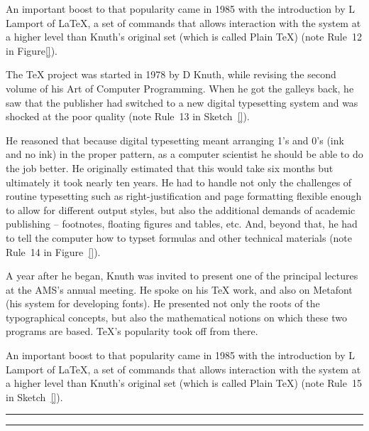 \documentclass[12pt]{book}
\newcommand{\blueB}[2][\linewidth]{%
{\color{blue}\rule{#1}{#2}}}
\newcommand{\greenB}[2][\linewidth]{%
{\color{green}\rule{#1}{#2}}}
\begin{document}
An important boost to that popularity came in 1985 with the introduction by L Lamport of LaTeX, a set of commands that allows interaction
with the system at a higher level than Knuth's original set (which is called Plain TeX) (note Rule~12 in Figure\ref{}).


The TeX project was started in 1978 by D Knuth, while revising the second volume of his Art of Computer Programming. When he got the
galleys back, he saw that the publisher had switched to a new digital typesetting system and was shocked at the poor quality (note Rule~13 in Sketch~\ref{}).


He reasoned that because digital typesetting meant arranging 1's and 0's (ink and no ink) in the proper pattern, as a computer scientist
he should be able to do the job better. He originally estimated that this would take six months but ultimately it took nearly ten years.
He had to handle not only the challenges of routine typesetting such as right-justification and page formatting flexible enough to allow
for different output styles, but also the additional demands of academic publishing -- footnotes, floating figures and tables, etc. And,
beyond that, he had to tell the computer how to typset formulas and other technical materials (note Rule~14 in Figure~\ref{}).


A year after he began, Knuth was invited to present one of the principal lectures at the AMS's annual meeting. He spoke on his TeX work,
and also on Metafont (his system for developing fonts). He presented not only the roots of the typographical concepts, but also the
mathematical notions on which these two programs are based. TeX's popularity took off from there.

An important boost to that popularity came in 1985 with the introduction by L Lamport of LaTeX, a set of commands that allows interaction
with the system at a higher level than Knuth's original set (which is called Plain TeX) (note Rule~15 in Sketch~\ref{}).









\blueB[.3\linewidth]{2cm}

\greenB[.7\linewidth]{6cm}
\end{document}
